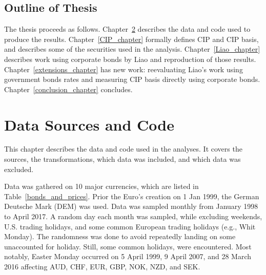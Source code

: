 \section{Outline of Thesis}

The thesis proceeds as follows.  Chapter~\ref{data_chapter} describes the data and code used to produce the results.  Chapter~\ref{CIP_chapter} formally defines CIP and CIP basis, and describes some of the securities used in the analysis.  Chapter~\ref{Liao_chapter} describes work using corporate bonds by Liao and reproduction of those results.  Chapter~\ref{extensions_chapter} has new work: reevaluating Liao's work using government bonds rates and measuring CIP basis directly using corporate bonds.  Chapter~\ref{conclusion_chapter} concludes.  

\chapter{Data Sources and Code} \label{data_chapter}

This chapter describes the data and code used in the analyses.  It covers the sources, the transformations, which data was included, and which data was excluded.  



Data was gathered on 10 major currencies, which are listed in Table~\ref{bonds_and_prices}.  Prior the Euro's creation on 1 Jan 1999, the German Deutsche Mark (DEM) was used.  Data was sampled monthly from January 1998 to April 2017.  A random day each month was sampled, while excluding weekends, U.S. trading holidays, and some common European trading holidays (e.g., Whit Monday).  The randomness was done to avoid repeatedly landing on some unaccounted for holiday.  Still, some common holidays, were encountered.  Most notably, Easter Monday occurred on 5 April 1999, 9 April 2007, and 28 March 2016 affecting AUD, CHF, EUR, GBP, NOK, NZD, and SEK.  


